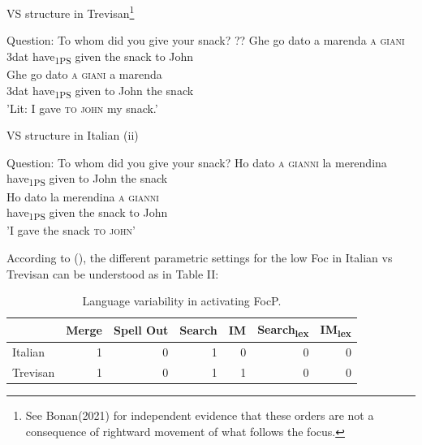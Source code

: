 \documentclass[fleqn,10pt]{wlscirep}
\begin{document}
\begin{exe}
    \ex VS structure in Trevisan\footnote{See Bonan(2021) for independent evidence that these orders are not a consequence of rightward movement of what follows the focus.}
        \begin{xlist}
            \ex Question: To whom did you give your snack?
            \ex \gll ?? Ghe go dato a marenda \textsc{a} \textsc{giani}\\
            {} 3dat have\textsubscript{1PS} given the snack to John\\
            \ex \gll Ghe go dato \textsc{a} \textsc{giani} a marenda\\
            3dat have\textsubscript{1PS} given to John the snack\\
            \glt 'Lit: I gave \textsc{to} \textsc{john} my snack.'
        \end{xlist}
\end{exe}

\begin{exe}
    \ex VS structure in Italian (ii)
        \begin{xlist}
            \ex Question: To whom did you give your snack?
            \ex \gll * Ho dato \textsc{a} \textsc{gianni} la merendina\\
            {} have\textsubscript{1PS} given to John the snack\\
            \ex \gll Ho dato la merendina \textsc{a} \textsc{gianni}\\
            have\textsubscript{1PS} given the snack to John\\
            \glt 'I gave the snack \textsc{to} \textsc{john}'
        \end{xlist}
\end{exe}

According to \citeauthor{bonan22} (\citeyear{bonan22}), the different parametric settings for the low Foc in Italian vs Trevisan can be understood as in Table II:

\begin{table}[ht]
    \centering
    \begin{tabular}{|l|r|r|r|r|r|r|}
    \hline
     & Merge & Spell Out & Search & IM & Search\textsubscript{lex} & IM\textsubscript{lex} \\
    \hline
    Italian & 1 & 0 & 1 & 0 & 0 & 0 \\
    \hline
    Trevisan & 1 & 0 & 1 & 1 & 0 & 0\\
    \hline
    \end{tabular}
    \caption{\label{tab:samp2}Language variability in activating FocP.}
    \end{table}
\end{document}
